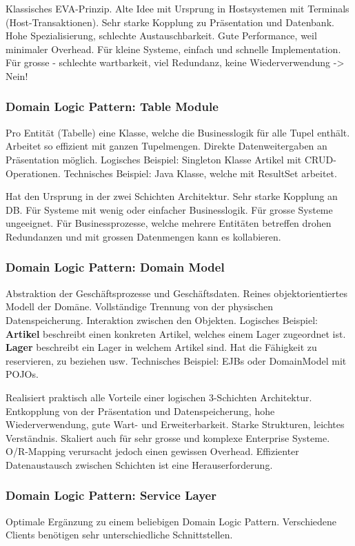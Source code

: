Klassisches EVA-Prinzip. Alte Idee mit Ursprung in Hostsystemen mit Terminals (Host-Transaktionen). Sehr starke Kopplung zu Präsentation und Datenbank. Hohe Spezialisierung, schlechte Austauschbarkeit. Gute Performance, weil minimaler Overhead. Für kleine Systeme, einfach und schnelle Implementation. Für grosse - schlechte wartbarkeit, viel Redundanz, keine Wiederverwendung -> Nein!

\subsubsection{Domain Logic Pattern: Table Module}
Pro Entität (Tabelle) eine Klasse, welche die Businesslogik für alle Tupel enthält. Arbeitet so effizient mit ganzen Tupelmengen. Direkte Datenweitergaben an Präsentation möglich. Logisches Beispiel: Singleton Klasse Artikel mit CRUD-Operationen. Technisches Beispiel: Java Klasse, welche mit ResultSet arbeitet.

Hat den Ursprung in der zwei Schichten Architektur. Sehr starke Kopplung an DB. Für Systeme mit wenig oder einfacher Businesslogik. Für grosse Systeme ungeeignet. Für Businessprozesse, welche mehrere Entitäten betreffen drohen Redundanzen und mit grossen Datenmengen kann es kollabieren.

\subsubsection{Domain Logic Pattern: Domain Model}
Abstraktion der Geschäftsprozesse und Geschäftsdaten. Reines objektorientiertes Modell der Domäne. Vollständige Trennung von der physischen Datenspeicherung. Interaktion zwischen den Objekten. Logisches Beispiel: \textbf{Artikel} beschreibt einen konkreten Artikel, welches einem Lager zugeordnet ist. \textbf{Lager} beschreibt ein Lager in welchem Artikel sind. Hat die Fähigkeit zu reservieren, zu beziehen usw.
Technisches Beispiel: EJBs oder DomainModel mit POJOs.

Realisiert praktisch alle Vorteile einer logischen 3-Schichten Architektur. Entkopplung von der Präsentation und Datenspeicherung, hohe Wiederverwendung, gute Wart- und Erweiterbarkeit. Starke Strukturen, leichtes Verständnis. Skaliert auch für sehr grosse und komplexe Enterprise Systeme.
O/R-Mapping verursacht jedoch einen gewissen Overhead. Effizienter Datenaustausch zwischen Schichten ist eine Herauserforderung.

\subsubsection{Domain Logic Pattern: Service Layer}
Optimale Ergänzung zu einem beliebigen Domain Logic Pattern. Verschiedene Clients benötigen sehr unterschiedliche Schnittstellen.

